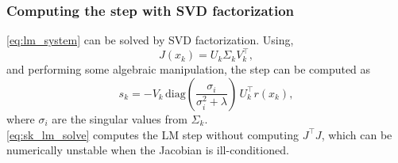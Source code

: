 \subsubsection{Computing the step with SVD factorization}
\cref{eq:lm_system} can be solved by SVD factorization. Using,
\begin{equation*}
    J(x_k) = U_k \Sigma_k V_k^\top,
\end{equation*}
and performing some algebraic manipulation, the step can be computed as
\begin{equation}
\label{eq:sk_lm_solve}
    s_k = -V_k \, \text{diag}\left(\dfrac{\sigma_i}{\sigma_i^2 + \lambda} \right) \, U_k^\top r(x_k), 
\end{equation}
where $\sigma_i$ are the singular values from $\Sigma_k$.\\

\cref{eq:sk_lm_solve} computes the LM step without computing $J^\top J$, which can be numerically unstable when the Jacobian is ill-conditioned.






